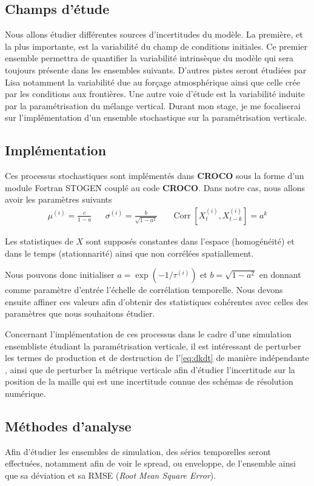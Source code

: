 \subsection{Champs d'étude}
Nous allons étudier différentes sources d'incertitudes du modèle. La première, et la plus importante, est la variabilité du champ de conditions initiales. Ce premier ensemble permettra de quantifier la variabilité intrinsèque du modèle qui sera toujours présente dans les ensembles suivants. D'autres pistes seront étudiées par Lisa notamment la variabilité due au forçage atmosphérique ainsi que celle crée par les conditions aux frontières. Une autre voie d'étude est la variabilité induite par la paramétrisation du mélange vertical. Durant mon stage, je me focaliserai sur l'implémentation d'un ensemble stochastique sur la paramétrisation verticale.

\subsection{Implémentation}
Ces processus stochastiques sont implémentés dans \textbf{CROCO} sous la forme d'un module Fortran \textsc{STOGEN} couplé au code \textbf{CROCO}. Dans notre cas, nous allons avoir les paramètres suivants
\begin{align}
	\mu^{(i)} = \frac{c}{1-a} && \sigma^{(i)} = \frac{b}{\sqrt{1 - a^2}} && \operatorname{Corr} \left[X^{(i)}_t, X^{(i)}_{t-k} \right] = a^k
\end{align}

Les statistiques de $X$ sont supposés constantes dans l'espace (homogénéité) et dans le temps (stationnarité) ainsi que non corrélées spatiallement.
 
Nous pouvons donc initialiser $a = \exp{\left(-1/\tau^{(i)} \right)}$ et $b = \sqrt{1 - a^2}$ en donnant comme paramètre d'entrée l'échelle de corrélation temporelle. Nous devons ensuite affiner ces valeurs afin d'obtenir des statistiques cohérentes avec celles des paramètres que nous souhaitons étudier.

Concernant l'implémentation de ces processus dans le cadre d'une simulation ensembliste étudiant la paramétrisation verticale, il est intéressant de perturber les termes de production et de destruction de l'\autoref{eq:dkdt} de manière indépendante \cite{juricke_stochastic_2017}, ainsi que de perturber la métrique verticale afin d'étudier l'incertitude sur la position de la maille qui est une incertitude connue des schémas de résolution numérique.


\subsection{Méthodes d'analyse}

Afin d'étudier les ensembles de simulation, des séries temporelles seront effectuées, notamment afin de voir le spread, ou enveloppe, de l'ensemble ainsi que sa déviation et sa RMSE (\textit{Root Mean Square Error}).






